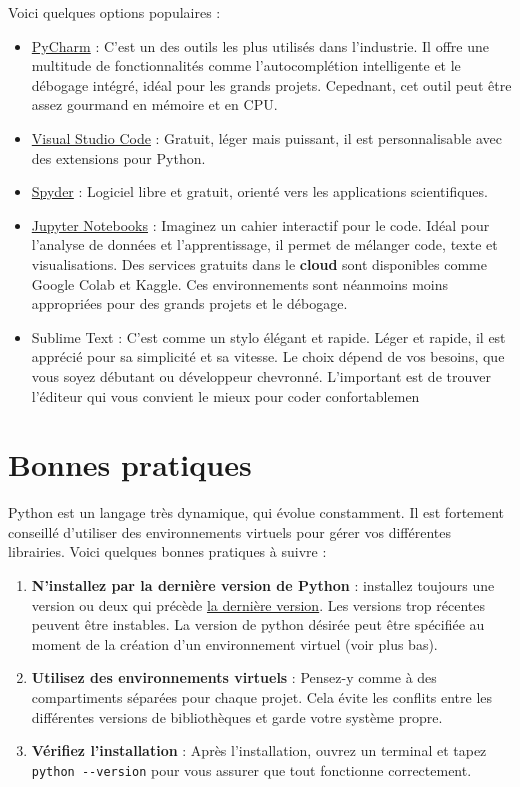 \documentclass[
  letterpaper,
  DIV=11,
  numbers=noendperiod]{scrreprt}
\begin{document}
Voici quelques options populaires :

\begin{itemize}
\item
  \href{https://www.jetbrains.com/pycharm/}{PyCharm} : C'est un des
  outils les plus utilisés dans l'industrie. Il offre une multitude de
  fonctionnalités comme l'autocomplétion intelligente et le débogage
  intégré, idéal pour les grands projets. Cepednant, cet outil peut être
  assez gourmand en mémoire et en CPU.
\item
  \href{https://code.visualstudio.com/}{Visual Studio Code} : Gratuit,
  léger mais puissant, il est personnalisable avec des extensions pour
  Python.
\item
  \href{https://www.spyder-ide.org/}{Spyder} : Logiciel libre et
  gratuit, orienté vers les applications scientifiques.
\item
  \href{https://jupyter.org/}{Jupyter Notebooks} : Imaginez un cahier
  interactif pour le code. Idéal pour l'analyse de données et
  l'apprentissage, il permet de mélanger code, texte et visualisations.
  Des services gratuits dans le \textbf{cloud} sont disponibles comme
  Google Colab et Kaggle. Ces environnements sont néanmoins moins
  appropriées pour des grands projets et le débogage.
\item
  Sublime Text : C'est comme un stylo élégant et rapide. Léger et
  rapide, il est apprécié pour sa simplicité et sa vitesse. Le choix
  dépend de vos besoins, que vous soyez débutant ou développeur
  chevronné. L'important est de trouver l'éditeur qui vous convient le
  mieux pour coder confortablemen
\end{itemize}

\section{Bonnes pratiques}\label{bonnes-pratiques}

Python est un langage très dynamique, qui évolue constamment. Il est
fortement conseillé d'utiliser des environnements virtuels pour gérer
vos différentes librairies. Voici quelques bonnes pratiques à suivre :

\begin{enumerate}
\def\labelenumi{\arabic{enumi}.}
\item
  \textbf{N'installez par la dernière version de Python} : installez
  toujours une version ou deux qui précède
  \href{https://www.python.org/downloads/}{la dernière version}. Les
  versions trop récentes peuvent être instables. La version de python
  désirée peut être spécifiée au moment de la création d'un
  environnement virtuel (voir plus bas).
\item
  \textbf{Utilisez des environnements virtuels} : Pensez-y comme à des
  compartiments séparées pour chaque projet. Cela évite les conflits
  entre les différentes versions de bibliothèques et garde votre système
  propre.
\item
  \textbf{Vérifiez l'installation} : Après l'installation, ouvrez un
  terminal et tapez \texttt{python\ -\/-version} pour vous assurer que
  tout fonctionne correctement.
\end{enumerate}
\end{document}
